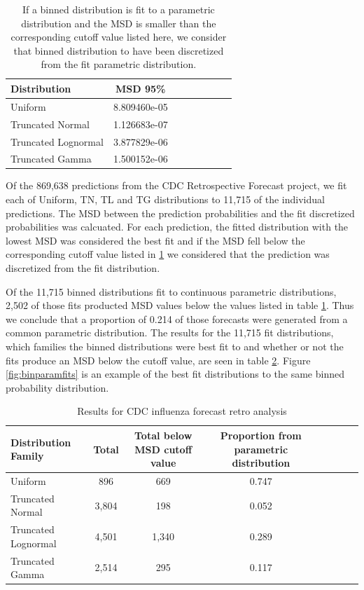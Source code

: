 \documentclass[11pt,notitlepage]{isuthesis}
\begin{document}
\begin{table}[h!]
  \centering
  \begin{tabular}{l*{6}{c}r}
  Distribution          & MSD 95\%  \\
  \hline
  Uniform               & 8.809460e-05   \\
  Truncated Normal      & 1.126683e-07  \\
  Truncated Lognormal   & 3.877829e-06  \\
  Truncated Gamma       & 1.500152e-06  \\
  \end{tabular}
  \caption[Discretized bin distribution cutoff values]{If a binned 
  distribution is fit to a parametric distribution and the MSD is smaller than
  the corresponding cutoff value listed here, we consider that binned 
  distribution to have been discretized from the fit parametric distribution.}
  \label{table:bincutoffs}
\end{table}




Of the 869,638 predictions from the CDC Retrospective Forecast project, we fit
each of Uniform, TN, TL and TG distributions to 11,715 of the individual 
predictions. The MSD between the prediction probabilities and the fit
discretized probabilities was calcuated. For each prediction, the fitted 
distribution with the lowest MSD was considered the best fit and if the MSD fell
below the corresponding cutoff value listed in \ref{table:bincutoffs} we 
considered that 
the prediction was discretized from the fit distribution. 

Of the 11,715 binned distributions fit to continuous parametric distributions,
2,502 of those fits producted MSD values below the values listed in table
\ref{table:bincutoffs}. Thus we conclude that a proportion of 0.214 of those
forecasts were generated from a common parametric distribution. The results for 
the
11,715 fit distributions, which families the binned distributions were best
fit to and whether or not the fits produce an MSD below the cutoff value, 
are seen in table \ref{table:cdcresults}. Figure \ref{fig:binparamfits} is an
example of
the best fit distributions to the same binned probability distribution.

\begin{table}[h!]
  \centering
  \begin{tabular}{l*{6}{c}r}
  Distribution Family   & Total    & Total below MSD cutoff value 
  & Proportion from parametric distribution\\
  \hline
  Uniform               & 896      & 669  & 0.747  \\
  Truncated Normal      & 3,804    & 198  & 0.052  \\
  Truncated Lognormal   & 4,501    & 1,340 & 0.289 \\
  Truncated Gamma       & 2,514    & 295   & 0.117 \\
  \end{tabular}
  \caption[CDC influenza retro analysis results]{Results for CDC influenza
  forecast retro analysis}
  \label{table:cdcresults}
\end{table}
\end{document}
